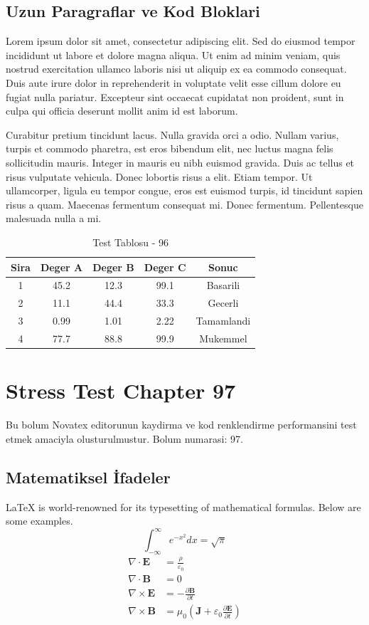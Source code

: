 \documentclass[12pt,a4paper]{article}
\begin{document}
\subsection{Uzun Paragraflar ve Kod Bloklari}
Lorem ipsum dolor sit amet, consectetur adipiscing elit. Sed do eiusmod tempor incididunt ut labore et dolore magna aliqua. Ut enim ad minim veniam, quis nostrud exercitation ullamco laboris nisi ut aliquip ex ea commodo consequat. Duis aute irure dolor in reprehenderit in voluptate velit esse cillum dolore eu fugiat nulla pariatur. Excepteur sint occaecat cupidatat non proident, sunt in culpa qui officia deserunt mollit anim id est laborum.

Curabitur pretium tincidunt lacus. Nulla gravida orci a odio. Nullam varius, turpis et commodo pharetra, est eros bibendum elit, nec luctus magna felis sollicitudin mauris. Integer in mauris eu nibh euismod gravida. Duis ac tellus et risus vulputate vehicula. Donec lobortis risus a elit. Etiam tempor. Ut ullamcorper, ligula eu tempor congue, eros est euismod turpis, id tincidunt sapien risus a quam. Maecenas fermentum consequat mi. Donec fermentum. Pellentesque malesuada nulla a mi.

\begin{table}[h!]
\centering
\begin{tabular}{|c|c|c|c|c|}
\hline
\textbf{Sira} & \textbf{Deger A} & \textbf{Deger B} & \textbf{Deger C} & \textbf{Sonuc} \\
\hline
1 & 45.2 & 12.3 & 99.1 & Basarili \\
2 & 11.1 & 44.4 & 33.3 & Gecerli \\
3 & 0.99 & 1.01 & 2.22 & Tamamlandi \\
4 & 77.7 & 88.8 & 99.9 & Mukemmel \\
\hline
\end{tabular}
\caption{Test Tablosu - 96}
\end{table}

\newpage
\section{Stress Test Chapter 97}
Bu bolum Novatex editorunun kaydirma ve kod renklendirme performansini test etmek amaciyla olusturulmustur. Bolum numarasi: 97.

\subsection{Matematiksel İfadeler}
\LaTeX{} is world-renowned for its typesetting of mathematical formulas. Below are some examples.
\begin{equation}
\int_{-\infty}^{\infty} e^{-x^2} dx = \sqrt{\pi}
\end{equation}
\begin{align}
\nabla \cdot \mathbf{E} &= \frac{\rho}{\varepsilon_0} \\
\nabla \cdot \mathbf{B} &= 0 \\
\nabla \times \mathbf{E} &= -\frac{\partial \mathbf{B}}{\partial t} \\
\nabla \times \mathbf{B} &= \mu_0\left(\mathbf{J} + \varepsilon_0 \frac{\partial \mathbf{E}}{\partial t}\right)
\end{align}
\end{document}
